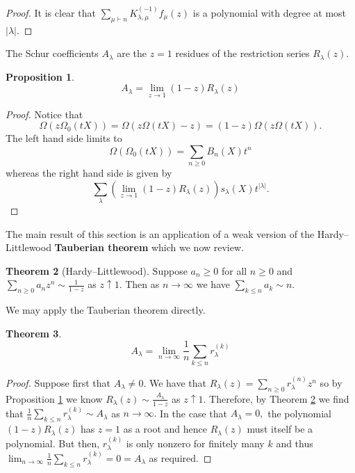 \documentclass[12pt,reqno]{amsart}
\theoremstyle{definition}
\newtheorem{thm}{Theorem}[section]
\newtheorem{prop}[thm]{Proposition}
\begin{document}
\begin{proof}
It is clear that $\sum_{\mu\vdash n} K^{(-1)}_{\lambda,\mu} f_{\mu}(z)$ is a polynomial with degree at most $|\lambda|.$

\end{proof}


The Schur coefficients $A_{\lambda}$ are the $z = 1$ residues of the restriction series $R_{\lambda}(z).$

\begin{prop}\label{Bell coefficients from restriction}
    $$A_{\lambda} = \lim_{z \rightarrow 1} (1-z)R_{\lambda}(z)$$
\end{prop}
\begin{proof}
Notice that
    $$\Omega(z\Omega_0(tX)) = \Omega(z\Omega(tX) -z) = (1-z)\Omega(z\Omega(tX)).$$ The left hand side limits to 
    $$\Omega(\Omega_0(tX)) = \sum_{n \geq 0} B_n(X)t^n$$ whereas the right hand side is given by 
    $$\sum_{\lambda} \left(\lim_{z \rightarrow 1}(1-z)R_{\lambda}(z) \right) s_{\lambda}(X)t^{|\lambda|}.$$
\end{proof}

The main result of this section is an application of a weak version of the Hardy--Littlewood \textbf{Tauberian theorem} which we now review.

\begin{thm}[Hardy--Littlewood]\label{tauberian}
Suppose $a_n \geq 0$ for all $n \geq 0$ and $\sum_{n \geq 0} a_n z^n \sim \frac{1}{1-z}$ as $z \uparrow 1.$ Then as $n \rightarrow \infty$ we have 
$ \sum_{k\leq n} a_k \sim n.$
\end{thm}

We may apply the Tauberian theorem directly. 

\begin{thm}\label{Schur asymptotic thm}
    $$A_{\lambda} = \lim_{n \rightarrow \infty} \frac{1}{n} \sum_{k\leq n} r_{\lambda}^{(k)}$$
\end{thm}
\begin{proof}
Suppose first that $A_{\lambda} \neq 0.$ We have that 
    $R_{\lambda}(z) = \sum_{n\geq 0} r_{\lambda}^{(n)} z^n$ so by Proposition \ref{Bell coefficients from restriction} we know $R_{\lambda}(z) \sim \frac{A_{\lambda}}{1-z}$ as $z \uparrow 1.$ Therefore, by Theorem \ref{tauberian} we find that $\frac{1}{n}\sum_{k \leq n} r_{\lambda}^{(k)} \sim A_{\lambda} $ as $n \rightarrow \infty.$ In the case that $A_{\lambda} = 0,$ the polynomial $(1-z)R_{\lambda}(z)$ has $z=1$ as a root and hence $R_{\lambda}(z)$ must itself be a polynomial. But then, $r_{\lambda}^{(k)}$ is only nonzero for finitely many $k$ and thus $\lim_{n\rightarrow \infty} \frac{1}{n}\sum_{k \leq n} r_{\lambda}^{(k)} = 0 = A_{\lambda}$ as required.
\end{proof}
\end{document}
